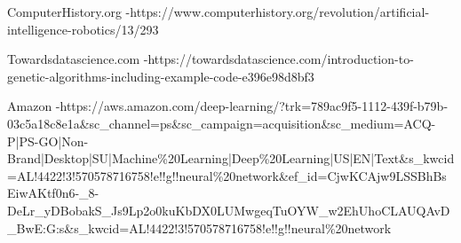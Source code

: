 \documentclass[11pt, twocolumn]{article}
\begin{document}
ComputerHistory.org 
-https://www.computerhistory.org/revolution/artificial-intelligence-robotics/13/293

Towardsdatascience.com
-https://towardsdatascience.com/introduction-to-genetic-algorithms-including-example-code-e396e98d8bf3

Amazon
-https://aws.amazon.com/deep-learning/?trk=789ac9f5-1112-439f-b79b-03c5a18c8e1a\&sc\_channel=ps\&sc\_campaign=acquisition\&sc\_medium=ACQ-P|PS-GO|Non-Brand|Desktop|SU|Machine\%20Learning|Deep\%20Learning|US|EN|Text\&s\_kwcid=AL!4422!3!570578716758!e!!g!!neural\%20network\&ef\_id=CjwKCAjw9LSSBhBsEiwAKtf0n6-\_8-DeLr\_yDBobakS\_Js9Lp2o0kuKbDX0LUMwgeqTuOYW\_w2EhUhoCLAUQAvD\_BwE:G:s\&s\_kwcid=AL!4422!3!570578716758!e!!g!!neural\%20network
\end{document}
